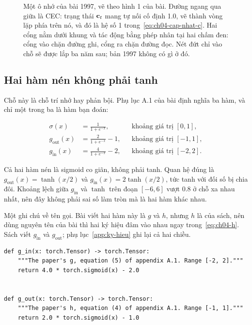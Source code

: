 \begin{figure}[htbp]
  \centering
  
  \caption{Một ô nhớ của bài 1997, vẽ theo hình 1 của bài. Đường ngang qua giữa
    là CEC: trạng thái \(\mathbf{c}_t\) mang tự nối cố định 1.0, vẽ thành vòng
    lặp phía trên nó, và đó là hệ số 1 trong~\eqref{eq:ch04-cap-nhat-c}. Hai
    cổng nằm dưới khung và tác động bằng phép nhân tại hai chấm đen: cổng vào
    chặn đường ghi, cổng ra chặn đường đọc. Nét đứt chỉ vào chỗ
     sẽ được lắp ba năm sau; bản 1997 không có gì ở
    đó.}
  \label{fig:ch04-o-nho}
\end{figure}

\subsection*{Hai hàm nén không phải tanh}

%
Chỗ này là chỗ trí nhớ hay phản bội. Phụ lục A.1 của bài định nghĩa ba hàm, và
chỉ một trong ba là hàm bạn đoán:

\begin{align}
  \sigma(x) &= \frac{1}{1 + e^{-x}}, & &\text{khoảng giá trị } [0, 1],
  \label{eq:ch04-sigma} \\
  g_{\mathrm{out}}(x) &= \frac{2}{1 + e^{-x}} - 1, & &\text{khoảng giá trị } [-1, 1],
  \label{eq:ch04-g-out} \\
  g_{\mathrm{in}}(x) &= \frac{4}{1 + e^{-x}} - 2, & &\text{khoảng giá trị } [-2, 2].
  \label{eq:ch04-g-in}
\end{align}

Cả hai hàm nén là sigmoid co giãn, không phải tanh. Quan hệ đúng là
\(g_{\mathrm{out}}(x) = \tanh(x/2)\) và \(g_{\mathrm{in}}(x) = 2\tanh(x/2)\),
tức tanh với đối số bị chia đôi. Khoảng lệch giữa \(g_{\mathrm{in}}\) và
\(\tanh\) trên đoạn \([-6, 6]\) vượt 0.8 ở chỗ xa nhau nhất, nên đây không phải
sai số làm tròn mà là hai hàm khác nhau.

Một ghi chú về tên gọi. Bài viết hai hàm này là \(g\) và \(h\), nhưng \(h\) là
 của sách, nên dùng nguyên tên của bài thì hai
ký hiệu đâm vào nhau ngay trong~\eqref{eq:ch04-h}. Sách viết
\(g_{\mathrm{in}}\) và \(g_{\mathrm{out}}\); phụ lục~\ref{app:ky-hieu} ghi lại
cả hai chiều.

\begin{verbatim}
def g_in(x: torch.Tensor) -> torch.Tensor:
    """The paper's g, equation (5) of appendix A.1. Range [-2, 2]."""
    return 4.0 * torch.sigmoid(x) - 2.0


def g_out(x: torch.Tensor) -> torch.Tensor:
    """The paper's h, equation (4) of appendix A.1. Range [-1, 1]."""
    return 2.0 * torch.sigmoid(x) - 1.0
\end{verbatim}

